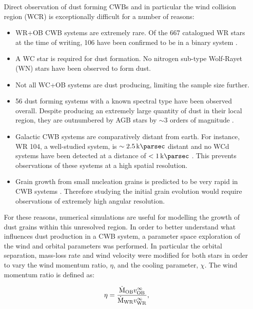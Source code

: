 Direct observation of dust forming CWBs and in particular the wind collision region (WCR) is exceptionally difficult for a number of reasons:

\begin{itemize}
  \item WR+OB CWB systems are extremely rare. Of the 667 catalogued WR stars at the time of writing, 106 have been confirmed to be in a binary system \parencite{rossloweSpatialDistributionGalactic2015,williamsVariableDustEmission2019}.
  \item A WC star is required for dust formation. No nitrogen sub-type Wolf-Rayet (WN) stars have been observed to form dust.
  \item Not all WC+OB systems are dust producing, limiting the sample size further.
  \item 56 dust forming systems with a known spectral type have been observed overall. Despite producing an extremely large quantity of dust in their local region, they are outnumbered by AGB stars by $\sim 3$ orders of magnitude \parencite{ishiharaGalacticDistributionsCarbon2011}.
  \item Galactic CWB systems are comparatively distant from earth. For instance, WR 104, a well-studied system, is $\sim \SI{2.5}{\kilo\parsec}$ distant \parencite{soulainSPHEREViewWolfRayet2018} and no WCd systems have been detected at a distance of $< 1 \, \si{\kilo\parsec}$ \parencite{rossloweSpatialDistributionGalactic2015}. This prevents observations of these systems at a high spatial resolution.
  \item Grain growth from small nucleation grains is predicted to be very rapid in CWB systems \parencite{zubkoPhysicalModelDust1998a}. Therefore studying the initial grain evolution would require observations of extremely high angular resolution.
\end{itemize}

For these reasons, numerical simulations are useful for modelling the growth of dust grains within this unresolved region.
In order to better understand what influences dust production in a CWB system, a parameter space exploration of the wind and orbital parameters was performed.
In particular the orbital separation, mass-loss rate and wind velocity were modified for both stars in order to vary the wind momentum ratio, $\eta$, and the cooling parameter, $\chi$.
The wind momentum ratio is defined as:

\begin{equation}
  \label{eq:paper1-eta}
  \eta = \frac{\dot{\text M}_\text{OB} v^\infty_\text{OB}}{\dot{\text M}_\text{WR}v^\infty_\text{WR}} ,
\end{equation}

